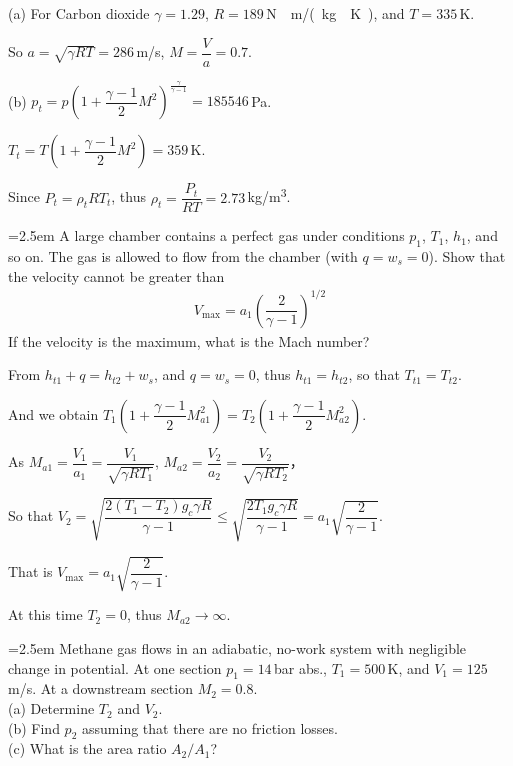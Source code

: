 \documentclass[12pt]{article}
\newlength{\questionlabelwidth}
\newcommand{\question}[2]{%
  \par\noindent
  {\hangindent=2.5em %
   \hangafter=1 %
   \makebox[\questionlabelwidth][l]{\textbf{#1}}#2\par}%
}
\begin{document}
\begin{answerbox}
(a) For Carbon dioxide $\gamma = 1.29$, $R=189$\,\si{N\cdot m/(kg\cdot K)}, and $T=335$\,\si{K}.

So $a=\sqrt{\gamma RT}=286$\,\si{m/s}, $M=\dfrac{V}{a}=0.7$.

(b) $p_t=p\left(1+\dfrac{\gamma -1}{2}M^2\right)^{\frac{\gamma}{\gamma -1}}=185546$\,\si{Pa}.

$T_t=T\left(1+\dfrac{\gamma -1}{2}M^2\right)=359$\,\si{K}.

Since $P_t=\rho_t R T_t$, thus $\rho_t=\dfrac{P_t}{RT}=2.73$\,\si{kg/m^3}.

\end{answerbox}

\question{4.11}{A large chamber contains a perfect gas under conditions $p_1$, $T_1$, $h_1$, and so on. The gas is allowed to flow from the chamber (with $q = w_s = 0$). Show that the velocity cannot be greater than\\
\begin{align*}
V_{\max}=a_1\left(\dfrac{2}{\gamma -1}\right)^{1/2}
\end{align*}
If the velocity is the maximum, what is the Mach number?
}

\begin{answerbox}
From $h_{t1}+q=h_{t2}+w_s$, and $q=w_s=0$, thus $h_{t1}=h_{t2}$, so that $T_{t1}=T_{t2}$.

And we obtain $T_1\left(1+\dfrac{\gamma -1}{2}M_{a1}^2\right)=T_2\left(1+\dfrac{\gamma -1}{2}M_{a2}^2\right)$.

As $M_{a1}=\dfrac{V_1}{a_1}=\dfrac{V_1}{\sqrt{\gamma RT_1}}$, $M_{a2}=\dfrac{V_2}{a_2}=\dfrac{V_2}{\sqrt{\gamma RT_2}}$，

So that $V_2=\sqrt{\dfrac{2(T_1-T_2)g_c\gamma R}{\gamma -1}}\leqslant \sqrt{\dfrac{2T_1g_c\gamma R}{\gamma -1}}=a_1\sqrt{\dfrac{2}{\gamma -1}}$.

That is $V_{\max}=a_1\sqrt{\dfrac{2}{\gamma -1}}$.

At this time $T_2=0$, thus $M_{a2}\to \infty$.
\end{answerbox}

\question{4.13}{Methane gas flows in an adiabatic, no-work system with negligible change in potential. At one section $p_1 = 14$\,\si{bar} abs., $T_1 = 500$\,\si{K}, and $V_1 = 125$\,\si{m/s}. At a downstream section $M_2 = 0.8$.\\
(a) Determine $T_2$ and $V_2$.\\
(b) Find $p_2$ assuming that there are no friction losses.\\
(c) What is the area ratio $A_2/A_1$?
}
\end{document}
